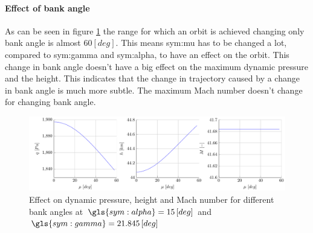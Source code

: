 \paragraph{Effect of bank angle}

As can be seen in figure \ref{fig:effectmu} the range for which an orbit is achieved changing only bank angle is almost $60 \left[deg\right]$. This means \gls{sym:mu} has to be changed a lot, compared to \gls{sym:gamma} and \gls{sym:alpha}, to have an effect on the orbit. This change in bank angle doesn't have a big effect on the maximum dynamic pressure and the height. This indicates that the change in trajectory caused by a change in bank angle is much more subtle. The maximum Mach number doesn't change for changing bank angle.
\begin{figure}[h]
	\centering
	\includegraphics[width=\textwidth]{./Figure/orbit/effectmu.pdf}
	\caption{Effect on dynamic pressure, height and Mach number for different bank angles at $\gls{sym:alpha}=15 \left[deg\right]$ and $\gls{sym:gamma}=21.845 \left[deg\right]$}
	\label{fig:effectmu}
\end{figure}


